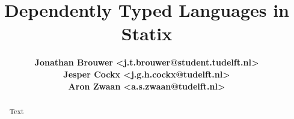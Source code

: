 \documentclass[english]{article}
\begin{document}
\title{\textbf{Dependently Typed Languages in Statix}}
\author{
	\textbf{Jonathan Brouwer <j.t.brouwer@student.tudelft.nl>} \\ 
	\textbf{Jesper Cockx <j.g.h.cockx@tudelft.nl>} \\ 
	\textbf{Aron Zwaan <a.s.zwaan@tudelft.nl>} \\ 
}
\maketitle

\begin{abstract}
Text
\end{abstract}







\end{document}
